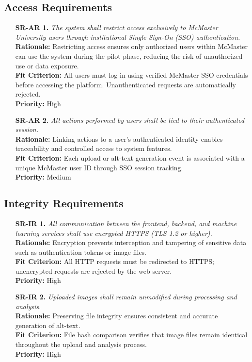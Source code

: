 \documentclass[12pt]{article}
\begin{document}
\subsection{Access Requirements}
\begin{itemize}
    \item[\textbf{SR-AR 1.}] \textit{The system shall restrict access exclusively to McMaster University users through institutional Single Sign-On (SSO) authentication.}\\
    \textbf{Rationale:} Restricting access ensures only authorized users within McMaster can use the system during the pilot phase, reducing the risk of unauthorized use or data exposure.\\
    \textbf{Fit Criterion:} All users must log in using verified McMaster SSO credentials before accessing the platform. Unauthenticated requests are automatically rejected.\\
    \textbf{Priority:} High

    \item[\textbf{SR-AR 2.}] \textit{All actions performed by users shall be tied to their authenticated session.}\\
    \textbf{Rationale:} Linking actions to a user’s authenticated identity enables traceability and controlled access to system features.\\
    \textbf{Fit Criterion:} Each upload or alt-text generation event is associated with a unique McMaster user ID through SSO session tracking.\\
    \textbf{Priority:} Medium
\end{itemize}

\subsection{Integrity Requirements}
\begin{itemize}
    \item[\textbf{SR-IR 1.}] \textit{All communication between the frontend, backend, and machine learning services shall use encrypted HTTPS (TLS 1.2 or higher).}\\
    \textbf{Rationale:} Encryption prevents interception and tampering of sensitive data such as authentication tokens or image files.\\
    \textbf{Fit Criterion:} All HTTP requests must be redirected to HTTPS; unencrypted requests are rejected by the web server.\\
    \textbf{Priority:} High

    \item[\textbf{SR-IR 2.}] \textit{Uploaded images shall remain unmodified during processing and analysis.}\\
    \textbf{Rationale:} Preserving file integrity ensures consistent and accurate generation of alt-text.\\
    \textbf{Fit Criterion:} File hash comparison verifies that image files remain identical throughout the upload and analysis process.\\
    \textbf{Priority:} High
\end{itemize}
\end{document}
